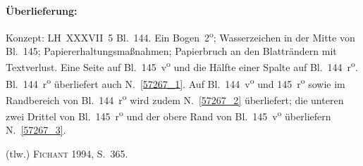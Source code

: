 %  
%
%
%
%
%
\frenchspacing
%
\begin{ledgroupsized}[r]{120mm}
\footnotesize
\pstart
\noindent\textbf{Überlieferung:}
\pend
\end{ledgroupsized}
\begin{ledgroupsized}[r]{114mm}
\footnotesize
\pstart \parindent -6mm 
% 
%
%
Konzept: LH~XXXVII~5 Bl.~144.
Ein Bogen~2\textsuperscript{o};
Wasserzeichen in der Mitte von Bl.~145;
Papiererhaltungsmaßnahmen;
Papierbruch an den Blatträndern mit Textverlust.
%
Eine Seite auf Bl.~145~v\textsuperscript{o} und die Hälfte einer Spalte auf Bl.~144~r\textsuperscript{o}.
Bl.~144~r\textsuperscript{o} überliefert auch N.~\ref{57267_1}.	
Auf Bl.~144~v\textsuperscript{o} und 145~r\textsuperscript{o} sowie im Randbereich von Bl.~144~r\textsuperscript{o} wird zudem N.~\ref{57267_2} überliefert;
die unteren zwei Drittel von Bl.~145~r\textsuperscript{o} und der obere Rand von Bl.~145~v\textsuperscript{o} überliefern N.~\ref{57267_3}.
\pend
\end{ledgroupsized}
%
\begin{ledgroupsized}[r]{114mm}
\footnotesize
\pstart
\parindent -6mm 
(tlw.) \textsc{Fichant} 1994, S.~365\cite{01056}.
\pend%
\end{ledgroupsized}
%
%
\frenchspacing
%
\vspace{8mm}
\pstart%
\normalsize%
\noindent%
%
%
